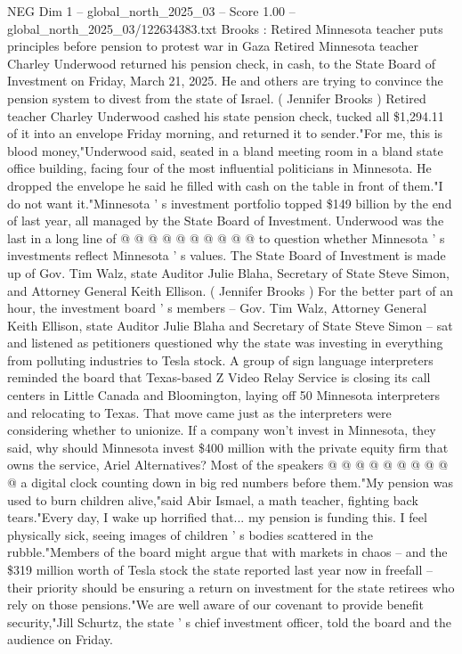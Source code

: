 \begin{textsample}{NEG Dim 1 – global\_north\_2025\_03 – Score 1.00 – global\_north\_2025\_03/122634383.txt}  \label{ex:f1_neg_053}
Brooks : Retired Minnesota teacher puts principles before pension to protest war in Gaza Retired Minnesota teacher Charley Underwood returned his pension check, in cash, to the State Board of Investment on Friday, March 21, 2025.
He and others are trying to convince the pension system to divest from the state of Israel. ( Jennifer Brooks ) Retired teacher Charley Underwood cashed his state pension check, tucked all \$1,294.11 of it into an envelope Friday morning, and returned it to sender."For me, this is blood money,"Underwood said, seated in a bland meeting room in a bland state office building, facing four of the most influential politicians in Minnesota.
He dropped the envelope he said he filled with cash on the table in front of them."I do not want it."Minnesota ' s investment portfolio topped \$149 billion by the end of last year, all managed by the State Board of Investment.
Underwood was the last in a long line of @ @ @ @ @ @ @ @ @ @ to question whether Minnesota ' s investments reflect Minnesota ' s values.
The State Board of Investment is made up of Gov.
Tim Walz, state Auditor Julie Blaha, Secretary of State Steve Simon, and Attorney General Keith Ellison. ( Jennifer Brooks ) For the better part of an hour, the investment board ' s members -- Gov.
Tim Walz, Attorney General Keith Ellison, state Auditor Julie Blaha and Secretary of State Steve Simon -- sat and listened as petitioners questioned why the state was investing in everything from polluting industries to Tesla stock.
A group of sign language interpreters reminded the board that Texas-based Z Video Relay Service is closing its call centers in Little Canada and Bloomington, laying off 50 Minnesota interpreters and relocating to Texas.
That move came just as the interpreters were considering whether to unionize.
If a company won't invest in Minnesota, they said, why should Minnesota invest \$400 million with the private equity firm that owns the service, Ariel Alternatives?
Most of the speakers @ @ @ @ @ @ @ @ @ @ a digital clock counting down in big red numbers before them."My pension was used to burn children alive,"said Abir Ismael, a math teacher, fighting back tears."Every day, I wake up horrified that... my pension is funding this.
I feel physically sick, seeing images of children ' s bodies scattered in the rubble."Members of the board might argue that with markets in chaos -- and the \$319 million worth of Tesla stock the state reported last year now in freefall -- their priority should be ensuring a return on investment for the state retirees who rely on those pensions."We are well aware of our covenant to provide benefit security,"Jill Schurtz, the state ' s chief investment officer, told the board and the audience on Friday.

\end{textsample}

